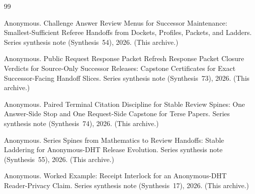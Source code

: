 \documentclass[11pt]{article}
\begin{document}
\begin{thebibliography}{99}\small

Anonymous.
\newblock Challenge Answer Review Menus for Successor Maintenance: Smallest-Sufficient Referee Handoffs from Dockets, Profiles, Packets, and Ladders.
\newblock Series synthesis note (Synthesis~54), 2026. (This archive.)

Anonymous.
\newblock Public Request Response Packet Refresh Response Packet Closure Verdicts for Source-Only Successor Releases: Capstone Certificates for Exact Successor-Facing Handoff Slices.
\newblock Series synthesis note (Synthesis~73), 2026. (This archive.)

Anonymous.
\newblock Paired Terminal Citation Discipline for Stable Review Spines: One Answer-Side Stop and One Request-Side Capstone for Terse Papers.
\newblock Series synthesis note (Synthesis~74), 2026. (This archive.)

Anonymous.
\newblock Series Spines from Mathematics to Review Handoffs: Stable Laddering for Anonymous-DHT Release Evolution.
\newblock Series synthesis note (Synthesis~55), 2026. (This archive.)

Anonymous.
\newblock Worked Example: Receipt Interlock for an Anonymous-DHT Reader-Privacy Claim.
\newblock Series synthesis note (Synthesis~17), 2026. (This archive.)

\end{thebibliography}
\end{document}
